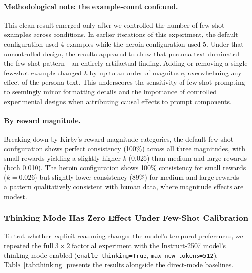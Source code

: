 \documentclass[11pt,a4paper]{article}
\begin{document}
\paragraph{Methodological note: the example-count confound.} This clean result emerged only after we controlled the number of few-shot examples across conditions. In earlier iterations of this experiment, the default configuration used 4 examples while the heroin configuration used 5. Under that uncontrolled design, the results appeared to show that persona text dominated the few-shot pattern---an entirely artifactual finding. Adding or removing a single few-shot example changed $k$ by up to an order of magnitude, overwhelming any effect of the persona text. This underscores the sensitivity of few-shot prompting to seemingly minor formatting details and the importance of controlled experimental designs when attributing causal effects to prompt components.

\paragraph{By reward magnitude.} Breaking down by Kirby's reward magnitude categories, the default few-shot configuration shows perfect consistency (100\%) across all three magnitudes, with small rewards yielding a slightly higher $k$ (0.026) than medium and large rewards (both 0.010). The heroin configuration shows 100\% consistency for small rewards ($k = 0.026$) but slightly lower consistency (89\%) for medium and large rewards---a pattern qualitatively consistent with human data, where magnitude effects are modest.

\subsubsection{Thinking Mode Has Zero Effect Under Few-Shot Calibration}
\label{sec:thinking-mode}

To test whether explicit reasoning changes the model's temporal preferences, we repeated the full $3 \times 2$ factorial experiment with the Instruct-2507 model's thinking mode enabled (\texttt{enable\_thinking=True}, \texttt{max\_new\_tokens=512}). Table~\ref{tab:thinking} presents the results alongside the direct-mode baselines.
\end{document}
